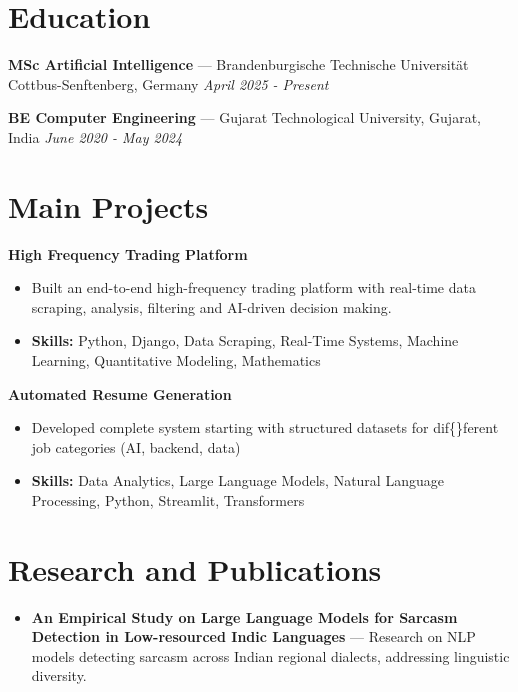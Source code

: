 \documentclass[a4paper,10pt]{article}
\begin{document}
\section*{Education}
\textbf{MSc Artificial Intelligence} — Brandenburgische Technische Universität Cottbus-Senftenberg, Germany \hfill \textit{April 2025 - Present}\par
\vspace{1.5pt}
\textbf{BE Computer Engineering} — Gujarat Technological University, Gujarat, India \hfill \textit{June 2020 - May 2024}\par

\section*{Main Projects}
\textbf{High Frequency Trading Platform}\par
\vspace{1pt}
\begin{itemize}
  \item Built an end-to-end high-frequency trading platform with real-time data scraping, analysis, filtering and AI-driven decision making.
  \item \textbf{Skills:} Python, Django, Data Scraping, Real-Time Systems, Machine Learning, Quantitative Modeling, Mathematics
\end{itemize}
\vspace{3pt}
\textbf{Automated Resume Generation}\par
\vspace{1pt}
\begin{itemize}
  \item Developed complete system starting with structured datasets for dif\{\}ferent job categories (AI, backend, data)
  \item \textbf{Skills:} Data Analytics, Large Language Models, Natural Language Processing, Python, Streamlit, Transformers
\end{itemize}

\section*{Research and Publications}
\begin{itemize}
\item \textbf{An Empirical Study on Large Language Models for Sarcasm Detection in Low-resourced Indic Languages} — Research on NLP models detecting sarcasm across Indian regional dialects, addressing linguistic diversity.
\end{itemize}
\end{document}

